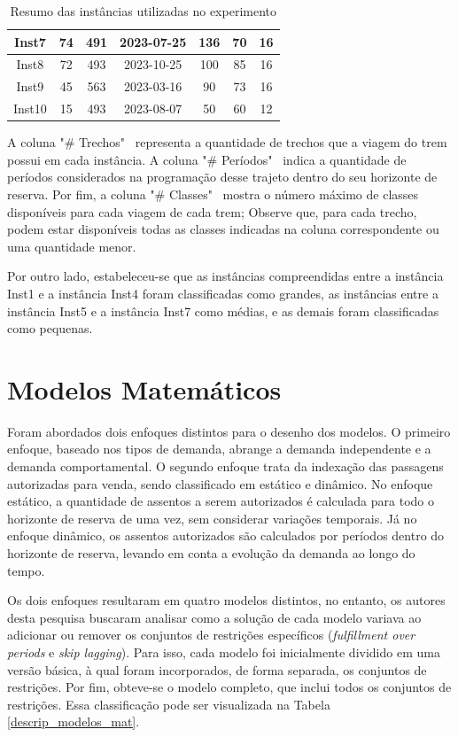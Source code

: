 \begin{table}[H]
\begin{tabular}{ccccccc}
		Inst7                                                               & 74 & 491 & 2023-07-25 & 136 & 70  & 16 \\\hline
		Inst8                                                               & 72 & 493 & 2023-10-25 & 100 & 85  & 16 \\
		Inst9                                                               & 45 & 563 & 2023-03-16 & 90  & 73  & 16 \\
		Inst10                                                              & 15 & 493 & 2023-08-07 & 50  & 60  & 12 \\
		\bottomrule
	\end{tabular}
	\caption{Resumo das instâncias utilizadas no experimento}
	\label{tab: instancias}
\end{table}

A coluna "\# Trechos" \, representa a quantidade de trechos que a viagem do trem possui em cada instância. A coluna "\# Períodos" \, indica a quantidade de períodos considerados na programação desse trajeto dentro do seu horizonte de reserva. Por fim, a coluna "\# Classes" \, mostra o número máximo de classes disponíveis para cada viagem de cada trem; Observe que, para cada trecho, podem estar disponíveis todas as classes indicadas na coluna correspondente ou uma quantidade menor.

Por outro lado, estabeleceu-se que as instâncias compreendidas entre a instância Inst1 e a instância Inst4 foram classificadas como grandes, as instâncias entre a instância Inst5 e a instância Inst7 como médias, e as demais foram classificadas como pequenas.

\section{Modelos Matemáticos}
Foram abordados dois enfoques distintos para o desenho dos modelos. O primeiro enfoque, baseado nos tipos de demanda, abrange a demanda independente e a demanda comportamental. O segundo enfoque trata da indexação das passagens autorizadas para venda, sendo classificado em estático e dinâmico. No enfoque estático, a quantidade de assentos a serem autorizados é calculada para todo o horizonte de reserva de uma vez, sem considerar variações temporais. Já no enfoque dinâmico, os assentos autorizados são calculados por períodos dentro do horizonte de reserva, levando em conta a evolução da demanda ao longo do tempo.

Os dois enfoques resultaram em quatro modelos distintos, no entanto, os autores desta pesquisa buscaram analisar como a solução de cada modelo variava ao adicionar ou remover os conjuntos de restrições específicos (\textit{fulfillment over periods} e \textit{skip lagging}). Para isso, cada modelo foi inicialmente dividido em uma versão básica, à qual foram incorporados, de forma separada, os conjuntos de restrições. Por fim, obteve-se o modelo completo, que inclui todos os conjuntos de restrições. Essa classificação pode ser visualizada na Tabela \ref{descrip_modelos_mat}.


